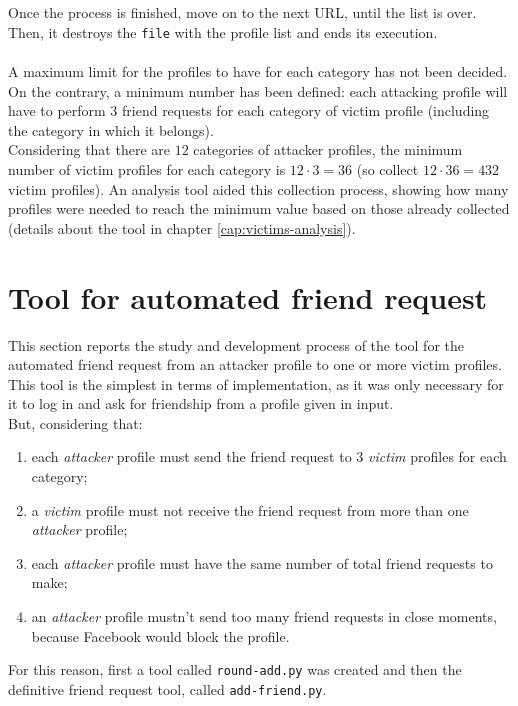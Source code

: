 \\\\Once the process is finished, move on to the next URL, until the list is over. Then, it destroys the \texttt{file} with the profile list and ends its execution.
\\\\A maximum limit for the profiles to have for each category has not been decided.\\On the contrary, a minimum number has been defined: each attacking profile will have to perform 3 friend requests for each category of victim profile (including the category in which it belongs). 
\\Considering that there are $12$ categories of attacker profiles, the minimum number of victim profiles for each category is $12 \cdot 3 = 36$ (so collect $12 \cdot 36 = 432$ victim profiles). An analysis tool aided this collection process, showing how many profiles were needed to reach the minimum value based on those already collected (details about the tool in chapter \ref{cap:victims-analysis}). 

\newpage
\section{Tool for automated friend request}
This section reports the study and development process of the tool for the automated friend request from an attacker profile to one or more victim profiles.\\
This tool is the simplest in terms of implementation, as it was only necessary for it to log in and ask for friendship from a profile given in input. \\ 
But, considering that:
\begin{enumerate}
	\item each \textit{attacker} profile must send the friend request to 3 \textit{victim} profiles for each category;
	\item a \textit{victim} profile must not receive the friend request from more than one \textit{attacker} profile;
	\item each \textit{attacker} profile must have the same number of total friend requests to make;
	\item an \textit{attacker} profile mustn't send too many friend requests in close moments, because Facebook would block the profile.
\end{enumerate}
For this reason, first a tool called \texttt{round-add.py} was created and then the definitive friend request tool, called \texttt{add-friend.py}. 

